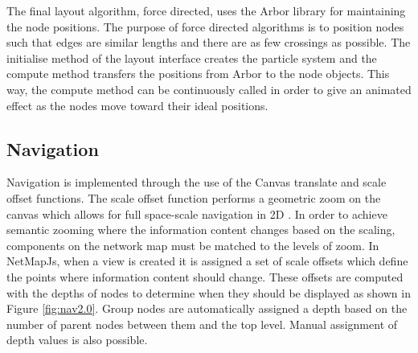 \documentclass[11pt, a4paper]{article}
\begin{document}
The final layout algorithm, force directed, uses the Arbor library for
maintaining the node positions. The purpose of force directed algorithms is to
position nodes such that edges are similar lengths and there are as few
crossings as possible.  The initialise method of the layout interface creates
the particle system and the compute method transfers the positions from Arbor to
the node objects. This way, the compute method can be continuously called in
order to give an animated effect as the nodes move toward their ideal positions.

\subsection{Navigation}
\label{sec:navigation.impl}

Navigation is implemented through the use of the Canvas translate and scale
offset functions. The scale offset function performs a geometric zoom on the
canvas which allows for full space-scale navigation in 2D \cite{Furnas_1995}. In
order to achieve semantic zooming where the information content changes based on
the scaling, components on the network map must be matched to the levels of
zoom. In NetMapJs, when a view is created it is assigned a set of scale offsets
which define the points where information content should change. These offsets
are computed with the depths of nodes to determine when they should be displayed
as shown in Figure \ref{fig:nav2.0}. Group nodes are automatically assigned a
depth based on the number of parent nodes between them and the top level.
Manual assignment of depth values is also possible. 
\end{document}
